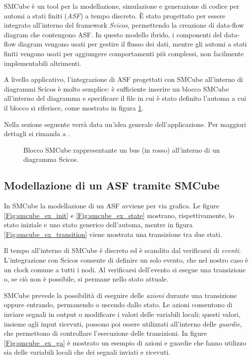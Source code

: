 SMCube\cite{smcube} è un tool per la modellazione, simulazione e generazione di codice per automi a stati finiti (\textsl{ASF}) a tempo discreto. È stato progettato per essere integrato all'interno del framework \textit{Scicos}\cite{scicos}, permettendo la creazione di data-flow diagram che contengono ASF. In questo modello ibrido, i componenti del data-flow diagram vengono usati per gestire il flusso dei dati, mentre gli automi a stati finiti vengono usati per aggiungere comportamenti più complessi, non facilmente implementabili altrimenti.

A livello applicativo, l'integrazione di ASF progettati con SMCube all'interno di diagrammi Scicos è molto semplice: è sufficiente inserire un blocco SMCube all'interno del diagramma e specificare il file in cui è stato definito l'automa a cui il blocco si riferisce, come mostrato in figura \ref{Fig:smcube_scicos_ex}.

Nella sezione seguente verrà data un'idea generale dell'applicazione. Per maggiori dettagli si rimanda a \cite{smcube_man}.

\begin{figure}
\centering
{}%
\caption{Blocco SMCube rappresentante un bus (in rosso) all'interno di un diagramma Scicos.}
\label{Fig:smcube_scicos_ex}
\end{figure}

\subsection{Modellazione di un ASF tramite SMCube}
In SMCube la modellazione di un ASF avviene per via grafica. Le figure \ref{Fig:smcube_ex_init} e \ref{Fig:smcube_ex_state} mostrano, rispettivamente, lo stato iniziale e uno stato generico dell'automa, mentre in figura \ref{Fig:smcube_ex_transition} viene mostrata una transizione tra due stati.

Il tempo all'interno di SMCube è discreto ed è scandito dal verificarsi di \textsl{eventi}. L'integrazione con Scicos consente di definire un solo evento, che nel nostro caso è un clock comune a tutti i nodi. Al verificarsi dell'evento si esegue una transizione o, se ciò non è possibile, si permane nello stato attuale.

SMCube prevede la possibilità di eseguire delle \textsl{azioni} durante una transizione oppure entrando, permanendo o uscendo dallo stato. Le azioni consentono di inviare segnali in output o modificare i valori delle variabili locali; questi valori, insieme agli input ricevuti, possono poi essere utilizzati all'interno delle \textsl{guardie}, che permettono di controllare l'esecuzione delle transizioni. In figure \ref{Fig:smcube_ex_ga} è mostrato un esempio di azioni e guardie che fanno utilizzo sia delle variabili locali che dei segnali inviati e ricevuti.

